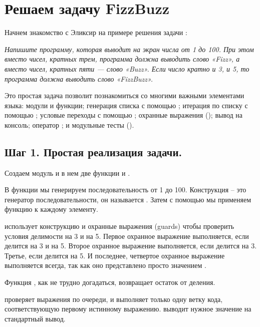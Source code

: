 \chapter{Решаем задачу FizzBuzz}

Начнем знакомство с Эликсир на примере решения задачи :

\textit{Напишите программу, которая выводит на экран числа от 1 до 100. При этом вместо чисел, кратных трем, программа должна выводить слово «Fizz», а вместо чисел, кратных пяти — слово «Buzz». Если число кратно и 3, и 5, то программа должна выводить слово «FizzBuzz».}

Это простая задача позволит познакомиться со многими важными элементами языка:
\blist
\e модули и функции;
\e генерация списка с помощью ;
\e итерация по списку с помощью ;
\e условые переходы с помощью ;
\e охранные выражения ();
\e вывод на консоль;
\e оператор ;
\e и модульные тесты ().
\elist

\section{Шаг 1. Простая реализация задачи.}

Создаем модуль  и в нем две функции  и .



В функции  мы генерируем последовательность от 1 до 100. Конструкция  -- это генератор последовательности, он называется . Затем с помощью  мы применяем функцию  к каждому элементу.

 использует конструкцию  и охранные выражения (guards) чтобы проверить условия делимости на 3 и на 5. Первое охранное выражение выполняется, если  делится на 3 и на 5. Второе охранное выражение выполняется, если  делится на 3. Третье, если  делится на 5. И последнее, четвертое охранное выражение выполняется всегда, так как оно представлено просто значением .

Функция , как не трудно догадаться, возвращает остаток от деления.

 проверяет выражения по очереди, и выполняет только одну ветку кода, соответствующую первому истинному выражению.  выводит нужное значение на стандартный вывод.

